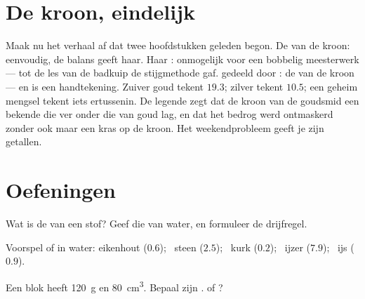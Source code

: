 \section{De kroon, eindelijk}

\begin{example}\label{ex:g6:density-floating:crown}
Maak nu het verhaal af dat twee hoofdstukken geleden begon. De
 van de kroon: eenvoudig, de balans geeft haar. Haar
: onmogelijk voor een bobbelig meesterwerk --- tot de les van de
badkuip de stijgmethode gaf.  gedeeld door : de
\emph{} van de kroon --- en  is een
handtekening. Zuiver goud tekent $19.3$; zilver tekent $10.5$; een
geheim mengsel tekent iets ertussenin. De legende zegt dat de kroon
van de goudsmid een  bekende die ver onder die van goud lag,
en dat het bedrog werd ontmaskerd zonder ook maar een kras op de
kroon. Het weekendprobleem geeft je zijn getallen.
\end{example}

\section{Oefeningen}

\begin{exercise}[$\star$]\label{exo:g6:density-floating:1}
Wat is de  van een stof? Geef die van water, en formuleer de
drijfregel.
\end{exercise}

\begin{exercise}[$\star$]\label{exo:g6:density-floating:2}
Voorspel  of  in water: eikenhout ($0.6$); \ steen
($2.5$); \ kurk ($0.2$); \ ijzer ($7.9$); \ ijs ($0.9$).
\end{exercise}

\begin{exercise}[$\star$]\label{exo:g6:density-floating:3}
Een blok heeft  \qty{120}{g} en  \qty{80}{cm^3}. Bepaal
zijn .  of ?
\end{exercise}

